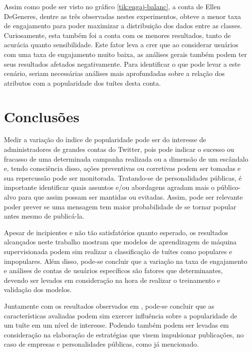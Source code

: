 \documentclass[oneside,openright,12pt]{ufsm_2015} %
\begin{document}
    \par Assim como pode ser visto no gráfico \ref{tik:engaj-balanc}, a conta de Ellen DeGeneres, dentre as três observadas nestes experimentos, obteve a menor taxa de engajamento para poder maximizar a distribuição dos dados entre as classes. Curiosamente, esta também foi a conta com os menores resultados, tanto de acurácia quanto sensibilidade. Este fator leva a crer que ao considerar usuários com uma taxa de engajamento muito baixa, as análises gerais também podem ter seus resultados afetados negativamente. Para identificar o que pode levar a este cenário, seriam necessárias análises mais aprofundadas sobre a relação dos atributos com a popularidade dos tuítes desta conta.


\chapter{Conclusões}
\label{sec:conclusao}

    \par Medir a variação do índice de popularidade pode ser do interesse de administradores de grandes contas do Twitter, pois pode indicar o sucesso ou fracasso de uma determinada campanha realizada ou a dimensão de um escândalo e, tendo consciência disso, ações preventivas ou corretivas podem ser tomadas e sua repercussão pode ser monitorada. Tratando-se de personalidades públicas, é importante identificar quais assuntos e/ou abordagens agradam mais o público-alvo para que assim possam ser mantidas ou evitadas. Assim, pode ser relevante poder prever se uma mensagem tem maior probabilidade de se tornar popular antes mesmo de publicá-la.
    
    \par Apesar de incipientes e não tão satisfatórios quanto esperado, os resultados alcançados neste trabalho mostram que modelos de aprendizagem de máquina supervisionada podem sim realizar a classificação de tuítes como populares e impopulares. Além disso, pode-se concluir que a variação na taxa de engajamento e análises de contas de usuários específicos são fatores que determinantes, devendo ser levados em consideração na hora de realizar o treinamento e validação dos modelos.
    
    \par Juntamente com os resultados observados em \cite{artigo:oliveira:18}, pode-se concluir que as características avaliadas podem sim exercer influência sobre a popularidade de um tuíte em um nível de interesse. Podendo também podem ser levadas em consideração na elaboração de estratégias que visem impulsionar publicações, no caso de empresas e personalidades públicas, como já mencionado. 
\end{document}

